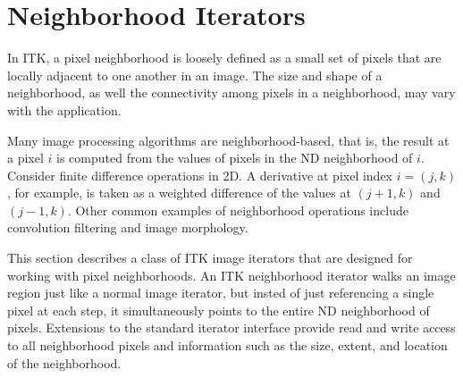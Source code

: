 

\section{Neighborhood Iterators}
\label{sec:NeighborhoodIterators}
In ITK, a pixel neighborhood is loosely defined as a small set of pixels that
are locally adjacent to one another in an image.  The size and shape
of a neighborhood, as well the connectivity among pixels in a neighborhood,
may vary with the application.

Many image processing algorithms are neighborhood-based, that is, the result at
a pixel $i$ is computed from the values of pixels in the ND neighborhood of
$i$. Consider finite difference operations in 2D.  A derivative at pixel index
$i = (j, k)$, for example, is taken as a weighted difference of the values
at $(j+1, k)$ and $(j-1, k)$. Other common examples of neighborhood operations
include convolution filtering and image morphology.

This section describes a class of ITK image iterators that are designed for
working with pixel neighborhoods. An ITK neighborhood iterator walks an image
region just like a normal image iterator, but insted of just referencing a
single pixel at each step, it simultaneously points to the entire ND
neighborhood of pixels.  Extensions to the standard iterator interface provide
read and write access to all neighborhood pixels and information
such as the size, extent, and location of the neighborhood.

